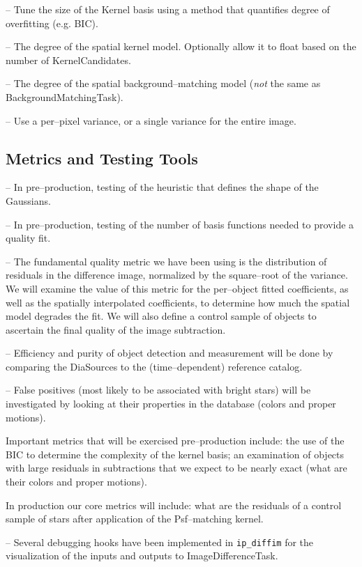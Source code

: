 \documentclass[prd, nofootinbib, floatfix, 11pt,tightenlines,times]{article}
\begin{document}
-- Tune the size of the Kernel basis using a method that quantifies
degree of overfitting (e.g. BIC).

-- The degree of the spatial kernel model.  Optionally allow it to
float based on the number of KernelCandidates.

-- The degree of the spatial background--matching model ({\it not} the
same as BackgroundMatchingTask).

-- Use a per--pixel variance, or a single variance for the entire
image.

\subsection{Metrics and Testing Tools}

-- In pre--production, testing of the heuristic that defines the shape
of the Gaussians.

-- In pre--production, testing of the number of basis functions needed
to provide a quality fit.  

-- The fundamental quality metric we have been using is the
distribution of residuals in the difference image, normalized by the
square--root of the variance.  We will examine the value of this
metric for the per--object fitted coefficients, as well as the
spatially interpolated coefficients, to determine how much the spatial
model degrades the fit.  We will also define a control sample of
objects to ascertain the final quality of the image subtraction.

-- Efficiency and purity of object detection and measurement will be
done by comparing the DiaSources to the (time--dependent) reference
catalog.

-- False positives (most likely to be associated with bright stars)
will be investigated by looking at their properties in the database
(colors and proper motions).

Important metrics that will be exercised pre--production include: the
use of the BIC to determine the complexity of the kernel basis; an
examination of objects with large residuals in subtractions that we
expect to be nearly exact (what are their colors and proper motions).

In production our core metrics will include: what are the residuals of
a control sample of stars after application of the Psf--matching
kernel.

-- Several debugging hooks have been implemented in {\tt ip\_diffim} for
the visualization of the inputs and outputs to ImageDifferenceTask.
\end{document}
